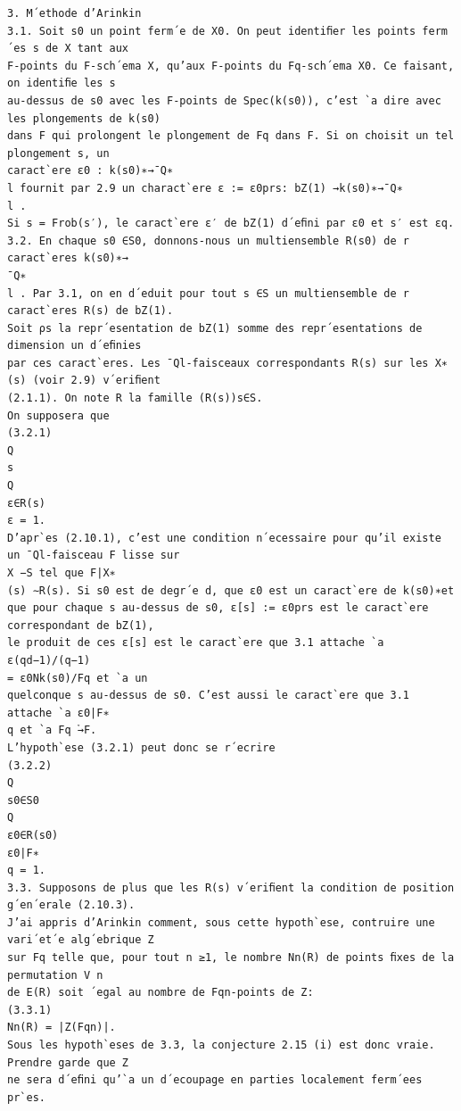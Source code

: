 \documentclass[11pt]{article}
\begin{document}
\begin{Verbatim}[breaklines=true,fontsize=\small]
3. M´ethode d’Arinkin
3.1. Soit s0 un point ferm´e de X0. On peut identiﬁer les points ferm´es s de X tant aux
F-points du F-sch´ema X, qu’aux F-points du Fq-sch´ema X0. Ce faisant, on identiﬁe les s
au-dessus de s0 avec les F-points de Spec(k(s0)), c’est `a dire avec les plongements de k(s0)
dans F qui prolongent le plongement de Fq dans F. Si on choisit un tel plongement s, un
caract`ere ε0 : k(s0)∗→¯Q∗
l fournit par 2.9 un charact`ere ε := ε0prs: bZ(1) →k(s0)∗→¯Q∗
l .
Si s = Frob(s′), le caract`ere ε′ de bZ(1) d´eﬁni par ε0 et s′ est εq.
3.2. En chaque s0 ∈S0, donnons-nous un multiensemble R(s0) de r caract`eres k(s0)∗→
¯Q∗
l . Par 3.1, on en d´eduit pour tout s ∈S un multiensemble de r caract`eres R(s) de bZ(1).
Soit ρs la repr´esentation de bZ(1) somme des repr´esentations de dimension un d´eﬁnies
par ces caract`eres. Les ¯Ql-faisceaux correspondants R(s) sur les X∗
(s) (voir 2.9) v´eriﬁent
(2.1.1). On note R la famille (R(s))s∈S.
On supposera que
(3.2.1)
Q
s
Q
ε∈R(s)
ε = 1.
D’apr`es (2.10.1), c’est une condition n´ecessaire pour qu’il existe un ¯Ql-faisceau F lisse sur
X −S tel que F|X∗
(s) ∼R(s). Si s0 est de degr´e d, que ε0 est un caract`ere de k(s0)∗et
que pour chaque s au-dessus de s0, ε[s] := ε0prs est le caract`ere correspondant de bZ(1),
le produit de ces ε[s] est le caract`ere que 3.1 attache `a ε(qd−1)/(q−1)
= ε0Nk(s0)/Fq et `a un
quelconque s au-dessus de s0. C’est aussi le caract`ere que 3.1 attache `a ε0|F∗
q et `a Fq ֒→F.
L’hypoth`ese (3.2.1) peut donc se r´ecrire
(3.2.2)
Q
s0∈S0
Q
ε0∈R(s0)
ε0|F∗
q = 1.
3.3. Supposons de plus que les R(s) v´eriﬁent la condition de position g´en´erale (2.10.3).
J’ai appris d’Arinkin comment, sous cette hypoth`ese, contruire une vari´et´e alg´ebrique Z
sur Fq telle que, pour tout n ≥1, le nombre Nn(R) de points ﬁxes de la permutation V n
de E(R) soit ´egal au nombre de Fqn-points de Z:
(3.3.1)
Nn(R) = |Z(Fqn)|.
Sous les hypoth`eses de 3.3, la conjecture 2.15 (i) est donc vraie. Prendre garde que Z
ne sera d´eﬁni qu’`a un d´ecoupage en parties localement ferm´ees pr`es.


\end{Verbatim}
\end{document}
